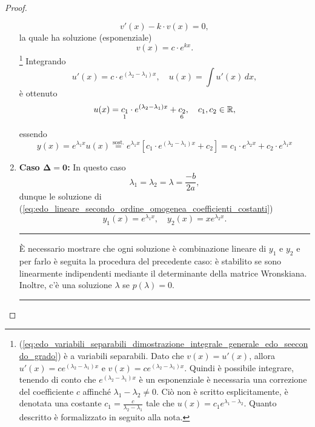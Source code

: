 \begin{proof}
\begin{enumerate}
\begin{equation}
			v'(x) - k \cdot v(x)=0,
		\end{equation}
		la quale ha soluzione (esponenziale)
		\begin{equation*}
			v(x) = c \cdot e^{kx}.
		\end{equation*}
		\footnote{(\ref{eq:edo_variabili_separabili_dimostrazione_integrale_generale_edo_seecondo_grado}) è a variabili separabili. Dato che $v(x)=u'(x)$, allora $u'(x)=ce^{(\lambda_2-\lambda_1)x}$ e $v(x)=ce^{(\lambda_2-\lambda_1)x}$. Quindi è possibile integrare, tenendo di conto che $e^{(\lambda_2-\lambda_1)x}$ è un esponenziale è necessaria una correzione del coefficiente $c$ affinché $\lambda_1-\lambda_2\neq 0$. Ciò non è scritto esplicitamente, è denotata una costante $c_1=\frac{c}{\lambda_2-\lambda_1}$ tale che $u(x) = c_1 e^{\lambda_1-\lambda_2}$. Quanto descritto è formalizzato in seguito alla nota.} Integrando
		\begin{equation*}
			u'(x)=c\cdot e^{(\lambda_2-\lambda_1)x},\quad u(x)=\int u'(x)\,dx,
		\end{equation*}
		è ottenuto
		\begin{equation*}
			u(x)=\underset{\footnotemark}{c_1}\cdot e^{(\lambda_2-\lambda_1)x}+\underset{\boldsymbol{\footnotemark}}{c_2},\quad c_1,c_2\in\mathbb{R},
		\end{equation*}
		essendo
		\begin{equation*}
			y(x)=e^{\lambda_1 x}u(x)\overset{\text{sost.}}{=}e^{\lambda_1x}\left[c_1\cdot e^{(\lambda_2-\lambda_1)x}+c_2\right] = c_1\cdot e^{\lambda_2 x} + c_2\cdot e^{\lambda_1 x}
		\end{equation*}
		\item \textbf{Caso $\boldsymbol{\Delta=0}$:} In questo caso
		\begin{equation*}
			\lambda_1=\lambda_2=\lambda=\frac{-b}{2a},
		\end{equation*}
		dunque le soluzione di (\ref{eq:edo_lineare_secondo_ordine_omogenea_coefficienti_costanti})
		\begin{equation*}
			y_1(x)=e^{\lambda_1 x},\quad y_2(x) = xe^{\lambda_2 x}.
		\end{equation*}
		\hrule\vspace{-2px}
		È necessario mostrare che ogni soluzione è combinazione lineare di $y_1$ e $y_2$ e per farlo è seguita la procedura del precedente caso: è stabilito se sono linearmente indipendenti mediante il determinante della matrice Wronskiana. Inoltre, c'è una soluzione $\lambda$ se $p(\lambda)=0$.
		\hrule\vspace{2px}
		

\end{enumerate}
\end{proof}
